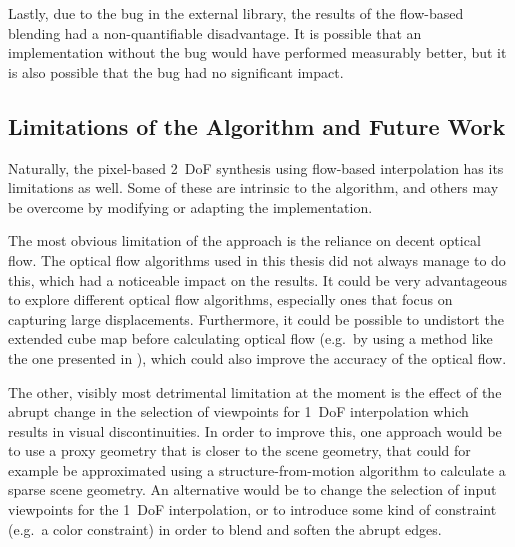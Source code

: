 Lastly, due to the bug in the external library, the results of the flow-based blending had a non-quantifiable disadvantage. It is possible that an implementation without the bug would have performed measurably better, but it is also possible that the bug had no significant impact.

\subsection{Limitations of the Algorithm and Future Work}
Naturally, the pixel-based 2~DoF synthesis using flow-based interpolation has its limitations as well. Some of these are intrinsic to the algorithm, and others may be overcome by modifying or adapting the implementation.

The most obvious limitation of the approach is the reliance on decent optical flow. The optical flow algorithms used in this thesis did not always manage to do this, which had a noticeable impact on the results. It could be very advantageous to explore different optical flow algorithms, especially ones that focus on capturing large displacements. Furthermore, it could be possible to undistort the extended cube map before calculating optical flow (e.g.\ by using a method like the one presented in \cite{fov}), which could also improve the accuracy of the optical flow.


The other, visibly most detrimental limitation at the moment is the effect of the abrupt change in the selection of viewpoints for 1~DoF interpolation which results in visual discontinuities.  
In order to improve this, one approach would be to use a proxy geometry that is closer to the scene geometry, that could for example be approximated using a structure-from-motion algorithm to calculate a sparse scene geometry. An alternative would be to change the selection of input viewpoints for the 1~DoF interpolation, or to introduce some kind of constraint (e.g.\ a color constraint) in order to blend and soften the abrupt edges.


